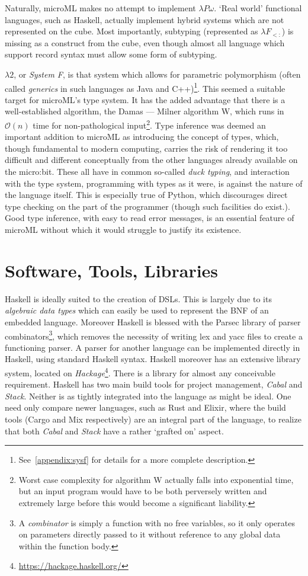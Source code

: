 \documentclass[12pt, a4paper]{report}
\begin{document}
Naturally, microML makes no attempt to implement $\lambda P\omega$. `Real world' functional
languages, such as Haskell, actually implement hybrid systems which are not represented on the cube.
Most importantly, subtyping (represented as $\lambda F_{<:}$) is missing as a construct from the cube, 
even though almost all language which support record syntax must allow some form of subtyping.

$\lambda 2$, or \textit{System F}, is that system which allows for \gls{parametric polymorphism} (often
called \textit{generics} in such languages as Java and C++)\footnote{See~\ref{appendix:sysf} for
details for a more complete description.}. This seemed a suitable target for microML's type system.
It has the added advantage that there is a well-established algorithm, the Damas --- Milner algorithm
W, which runs in $\mathcal{O}(n)$ time for non-pathological input\footnote{Worst case complexity
for algorithm W actually falls into exponential time, but an input program would have to be both
perversely written and extremely large before this would become a significant liability.}. Type
inference was deemed an important addition to microML as introducing the concept of types, which,
though fundamental to modern computing, carries the risk of rendering it too difficult and different
conceptually from the other languages already available on the micro:bit. These all have in common
so-called \textit{\gls{duck typing}}, and interaction with the type system, programming with types as
it were, is against the nature of the language itself. This is especially true of Python, which
discourages direct type checking on the part of the programmer (though such facilities do exist.).
Good type inference, with easy to read error messages, is an essential feature of microML without
which it would struggle to justify its existence.

\section{Software, Tools, Libraries}
Haskell is ideally suited to the creation of \gls{DSL}s. This is largely due to its
\textit{algebraic data types} which can easily be used to represent the BNF of an embedded
language. Moreover Haskell is blessed with the Parsec library\cite{leijen2001} of parser combinators\footnote{A
\textit{combinator} is simply a function with no free variables, so it only operates on
parameters directly passed to it without reference to any global data within the function
body.}, which removes the necessity of writing lex and yacc files to create a functioning
parser. A parser for another language can be implemented directly in Haskell, using
standard Haskell syntax. Haskell moreover has an extensive library system, located on
\textit{Hackage}\footnote{\url{https://hackage.haskell.org/}}. There is a library for almost any
conceivable requirement. Haskell has two main build tools for project management, \textit{Cabal} and
\textit{Stack}. Neither is as tightly integrated into the language as might be ideal. One need only
compare newer languages, such as Rust and Elixir, where the build tools (Cargo and Mix respectively)
are an integral part of the language, to realize that both \textit{Cabal} and \textit{Stack} have a
rather `grafted on' aspect.
\end{document}
